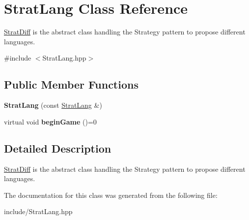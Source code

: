 \hypertarget{classStratLang}{\section{\-Strat\-Lang \-Class \-Reference}
\label{classStratLang}
}


\hyperlink{classStratDiff}{\-Strat\-Diff} is the abstract class handling the \-Strategy pattern to propose different languages.  




{\ttfamily \#include $<$\-Strat\-Lang.\-hpp$>$}

\subsection*{\-Public \-Member \-Functions}
\begin{DoxyCompactItemize}
\item 
\hypertarget{classStratLang_abf94a073c26c844bf2aaa2a49c9873b5}{{\bfseries \-Strat\-Lang} (const \hyperlink{classStratLang}{\-Strat\-Lang} \&)}\label{classStratLang_abf94a073c26c844bf2aaa2a49c9873b5}

\item 
\hypertarget{classStratLang_aa7a231de0ae7c735b16ae06d898e1141}{virtual void {\bfseries begin\-Game} ()=0}\label{classStratLang_aa7a231de0ae7c735b16ae06d898e1141}

\end{DoxyCompactItemize}


\subsection{\-Detailed \-Description}
\hyperlink{classStratDiff}{\-Strat\-Diff} is the abstract class handling the \-Strategy pattern to propose different languages. 

\-The documentation for this class was generated from the following file\-:\begin{DoxyCompactItemize}
\item 
include/\-Strat\-Lang.\-hpp\end{DoxyCompactItemize}
